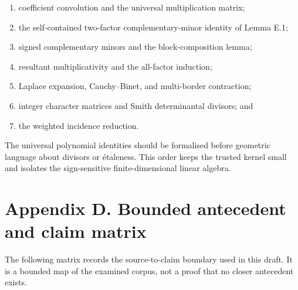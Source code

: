 \documentclass[
  11pt,
  a4paper,
]{article}
\providecommand{\tightlist}{%
  \setlength{\itemsep}{0pt}\setlength{\parskip}{0pt}}
\begin{document}
\begin{enumerate}
\def\labelenumi{\arabic{enumi}.}
\tightlist
\item
  coefficient convolution and the universal multiplication matrix;
\item
  the self-contained two-factor complementary-minor identity of Lemma
  E.1;
\item
  signed complementary minors and the block-composition lemma;
\item
  resultant multiplicativity and the all-factor induction;
\item
  Laplace expansion, Cauchy--Binet, and multi-border contraction;
\item
  integer character matrices and Smith determinantal divisors; and
\item
  the weighted incidence reduction.
\end{enumerate}

The universal polynomial identities should be formalised before
geometric language about divisors or étaleness. This order keeps the
trusted kernel small and isolates the sign-sensitive finite-dimensional
linear algebra.

\section{Appendix D. Bounded antecedent and claim
matrix}\label{appendix-d.-bounded-antecedent-and-claim-matrix}

The following matrix records the source-to-claim boundary used in this
draft. It is a bounded map of the examined corpus, not a proof that no
closer antecedent exists.
\end{document}
